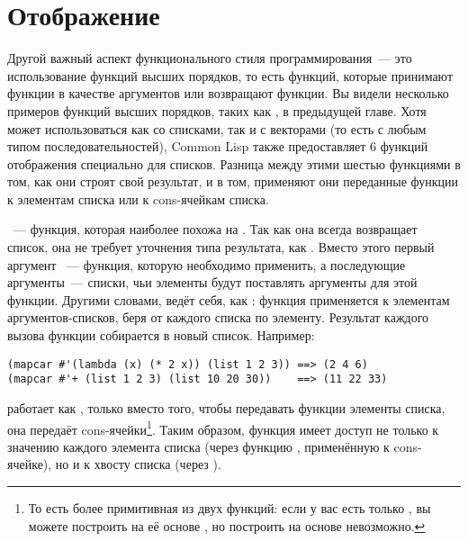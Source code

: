 \section{Отображение}
\label{sec:12-map}

Другой важный аспект функционального стиля программирования~--- это использование функций
высших порядков, то есть функций, которые принимают функции в качестве аргументов или
возвращают функции. Вы видели несколько примеров функций высших порядков, таких как
, в предыдущей главе. Хотя  может использоваться как со списками, так
и с векторами (то есть с любым типом последовательностей), Common Lisp также предоставляет 6
функций отображения специально для списков. Разница между этими шестью функциями в том, как
они строят свой результат, и в том, применяют они переданные функции к элементам списка
или к cons-ячейкам списка.

~--- функция, которая наиболее похожа на . Так как она всегда возвращает список,
она не требует уточнения типа результата, как . Вместо этого первый аргумент
~--- функция, которую необходимо применить, а последующие аргументы~--- списки,
чьи элементы будут поставлять аргументы для этой функции. Другими словами, 
ведёт себя, как : функция применяется к элементам аргументов-списков, беря от
каждого списка по элементу. Результат каждого вызова функции собирается в новый
список. Например:

\begin{lstlisting}
(mapcar #'(lambda (x) (* 2 x)) (list 1 2 3)) ==> (2 4 6)
(mapcar #'+ (list 1 2 3) (list 10 20 30))    ==> (11 22 33)
\end{lstlisting}

 работает как , только вместо того, чтобы передавать функции
элементы списка, она передаёт cons-ячейки\footnote{То есть  более примитивная
  из двух функций: если у вас есть только , вы можете построить на её основе
  , но построить  на основе  невозможно.}.  Таким
образом, функция имеет доступ не только к значению каждого элемента списка (через функцию
, применённую к cons-ячейке), но и к хвосту списка (через ).

